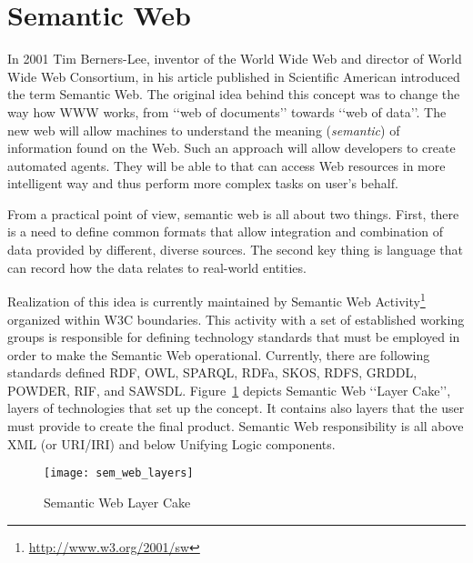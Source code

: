 %
\section{Semantic Web}
\label{sec:ch2_semantic_web}

In 2001 Tim Berners-Lee, inventor of the World Wide Web and director of World Wide Web Consortium, in his article published in Scientific American\cite{berneslee:semanticWeb} introduced the term Semantic Web. The original idea behind this concept was to change the way how WWW works, from \lq\lq{}web of documents\rq\rq{} towards \lq\lq{}web of data\rq\rq{}. The new web will allow machines to understand the meaning (\emph{semantic}) of information found on the Web. Such an approach will allow developers to create automated agents. They will be able to that can access Web resources in more intelligent way and thus perform more complex tasks on user\rq{}s behalf.

From a practical point of view, semantic web is all about two things. First, there is a need to define common formats that allow integration and combination of data provided by different, diverse sources. The second key thing is language that can record how the data relates to real-world entities.

Realization of this idea is currently maintained by Semantic Web Activity\footnote{\url{http://www.w3.org/2001/sw}} organized within W3C boundaries. This activity with a set of established working groups is responsible for defining technology standards that must be employed in order to make the Semantic Web operational. Currently, there are following standards defined RDF, OWL, SPARQL, RDFa, SKOS, RDFS, GRDDL, POWDER, RIF, and SAWSDL. Figure~\ref{fig:sem_web_layers} depicts Semantic Web \lq\lq{}Layer Cake\rq\rq{}, layers of technologies that set up the concept. It contains also layers that the user must provide to create the final product. Semantic Web responsibility is all above XML (or URI/IRI) and below Unifying Logic components.

\begin{figure}[ht]
	\centering
	\texttt{[image: sem\_web\_layers]}
	\caption{Semantic Web Layer Cake}
	\label{fig:sem_web_layers}
\end{figure}

